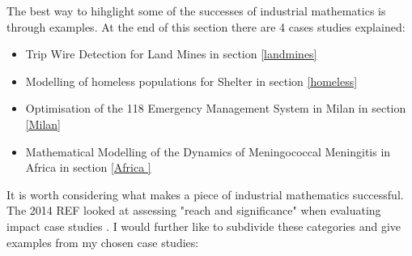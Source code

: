 \documentclass[11pt]{article} %
\begin{document}
	The best way to hihglight some of the successes of industrial mathematics is through examples. At the end of this section there are 4 cases studies explained: 
	\begin{itemize}
		\item Trip Wire Detection for Land Mines in section \ref{landmines}
		\item Modelling of homeless populations for Shelter in section \ref{homeless}
		\item Optimisation of the 118 Emergency Management System in Milan in section \ref{Milan}
		\item Mathematical Modelling of the Dynamics of Meningococcal Meningitis in Africa in section \ref{Africa }
	\end{itemize}

It is worth considering what makes a piece of industrial mathematics successful. The 2014 REF looked at assessing "reach and significance" when evaluating impact case studies \cite{impactcriteria2014}. I would further like to subdivide these categories and give examples from my chosen case studies:
\end{document}
